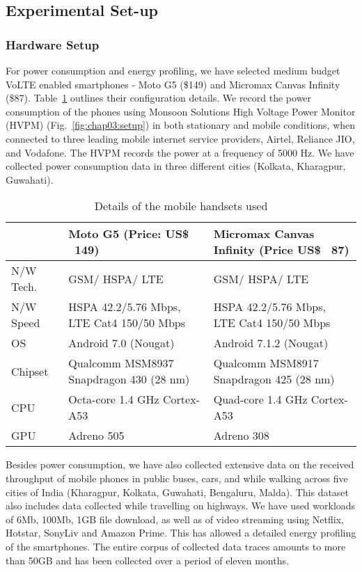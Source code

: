 \subsection{Experimental Set-up}
\subsubsection{Hardware Setup}
For power consumption and energy profiling, we have selected medium budget VoLTE enabled smartphones -  Moto G5  (\$149) and Micromax Canvas Infinity (\$87). Table~\ref{tab:chap03:handset_details} outlines their configuration details. We record the power consumption of the phones using Monsoon Solutions High Voltage Power Monitor (HVPM) \cite{HVPM, Yang2018,Geng2015} (Fig.~\ref{fig:chap03:setup}) in both stationary and mobile conditions, when connected to three leading mobile internet service providers, Airtel, Reliance JIO, and Vodafone. The \ac{HVPM} records the power at a frequency of 5000 Hz. We have collected power consumption data in three different cities (Kolkata, Kharagpur, Guwahati).
\begin{table}[!t]
    \scriptsize
    \centering
      \caption{Details of the mobile handsets used}
    \begin{tabular}{|p{0.6cm}||p{3.4cm}|p{3.4cm}|}
    \hline
         \textbf{}  & \textbf{Moto G5 (Price: US\$ ~149)} & \textbf{Micromax Canvas Infinity (Price US\$ ~87)}\\
          \hline \hline 
         N/W Tech. & GSM/ HSPA/ LTE &  GSM/ HSPA/ LTE\\ \hline
         N/W Speed & HSPA 42.2/5.76 Mbps, LTE Cat4 150/50 Mbps & HSPA 42.2/5.76 Mbps, LTE Cat4 150/50 Mbps\\ \hline
         OS & Android 7.0 (Nougat) & Android 7.1.2 (Nougat) \\ \hline
         Chipset & Qualcomm MSM8937 Snapdragon 430 (28 nm) & Qualcomm MSM8917 Snapdragon 425 (28 nm)\\ \hline
         CPU & Octa-core 1.4 GHz Cortex-A53 & Quad-core 1.4 GHz Cortex-A53\\ \hline
         GPU & Adreno 505 & Adreno 308\\ \hline
    \end{tabular}
    \label{tab:chap03:handset_details}
\end{table}
\indent Besides power consumption, we have also collected extensive data on the received throughput of mobile phones in public buses, cars, and while walking across five cities of India (Kharagpur, Kolkata, Guwahati, Bengaluru, Malda). This dataset also includes data collected while travelling on highways. We have used workloads of 6Mb, 100Mb, 1GB file download, as well as of video streaming using Netflix, Hotstar, SonyLiv and Amazon Prime. This has allowed a detailed energy profiling of the smartphones. The entire corpus of collected data traces amounts to more than 50GB and has been collected over a period of eleven months. 
